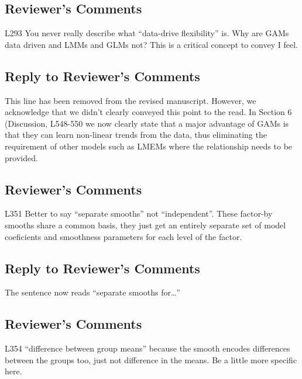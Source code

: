 \documentclass[
]{article}
\begin{document}
\hypertarget{reviewers-comments-23}{%
\subsection{Reviewer's Comments}\label{reviewers-comments-23}}

L293 You never really describe what ``data-drive flexibility'' is. Why are GAMs data driven and LMMs and GLMs not? This is a critical concept to convey I feel.

\hypertarget{section-24}{%
\subsection{\texorpdfstring{\textcolor{reviewersblue} {Reply to Reviewer's Comments}}{}}\label{section-24}}

This line has been removed from the revised manuscript. However, we acknowledge that we didn't clearly conveyed this point to the read. In Section 6 (Discussion, L548-550 we now clearly state that a major advantage of GAMs is that they can learn non-linear trends from the data, thus eliminating the requirement of other models such as LMEMs where the relationship needs to be provided.

\hypertarget{reviewers-comments-24}{%
\subsection{Reviewer's Comments}\label{reviewers-comments-24}}

L351 Better to say ``separate smooths'' not ``independent''. These factor-by smooths share a common basis, they just get an entirely separate set of model coeficients and smoothness parameters for each level of the factor.

\hypertarget{section-25}{%
\subsection{\texorpdfstring{\textcolor{reviewersblue} {Reply to Reviewer's Comments}}{}}\label{section-25}}

The sentence now reads ``separate smooths for\ldots{}''

\hypertarget{reviewers-comments-25}{%
\subsection{Reviewer's Comments}\label{reviewers-comments-25}}

L354 ``difference between group means'' because the smooth encodes differences between the groups too, just not difference in the means. Be a little more specific here.
\end{document}
